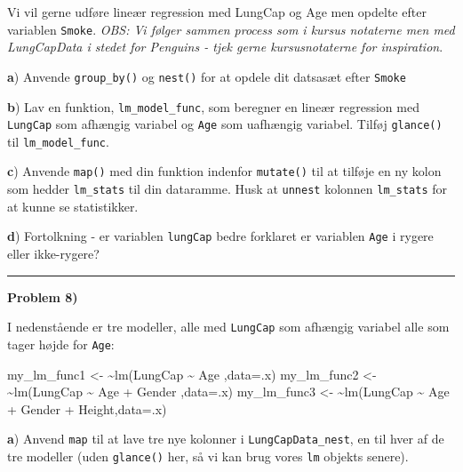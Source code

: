 \documentclass[
]{book}
\newenvironment{Shaded}{\begin{snugshade}}{\end{snugshade}}
\newcommand{\AttributeTok}[1]{\textcolor[rgb]{0.77,0.63,0.00}{#1}}
\newcommand{\ErrorTok}[1]{\textcolor[rgb]{0.64,0.00,0.00}{\textbf{#1}}}
\newcommand{\FunctionTok}[1]{\textcolor[rgb]{0.00,0.00,0.00}{#1}}
\newcommand{\NormalTok}[1]{#1}
\newcommand{\OtherTok}[1]{\textcolor[rgb]{0.56,0.35,0.01}{#1}}
\newcommand{\SpecialCharTok}[1]{\textcolor[rgb]{0.00,0.00,0.00}{#1}}
\begin{document}
Vi vil gerne udføre lineær regression med LungCap og Age men opdelte efter variablen \texttt{Smoke}. \emph{OBS: Vi følger sammen process som i kursus notaterne men med LungCapData i stedet for Penguins - tjek gerne kursusnotaterne for inspiration}.

\textbf{a}) Anvende \texttt{group\_by()} og \texttt{nest()} for at opdele dit datsasæt efter \texttt{Smoke}

\textbf{b}) Lav en funktion, \texttt{lm\_model\_func}, som beregner en lineær regression med \texttt{LungCap} som afhængig variabel og \texttt{Age} som uafhængig variabel. Tilføj \texttt{glance()} til \texttt{lm\_model\_func}.

\textbf{c}) Anvende \texttt{map()} med din funktion indenfor \texttt{mutate()} til at tilføje en ny kolon som hedder \texttt{lm\_stats} til din dataramme. Husk at \texttt{unnest} kolonnen \texttt{lm\_stats} for at kunne se statistikker.

\textbf{d}) Fortolkning - er variablen \texttt{lungCap} bedre forklaret er variablen \texttt{Age} i rygere eller ikke-rygere?

\begin{center}\rule{0.5\linewidth}{0.5pt}\end{center}

\textbf{Problem 8)}

I nedenstående er tre modeller, alle med \texttt{LungCap} som afhængig variabel alle som tager højde for \texttt{Age}:

\begin{Shaded}
\begin{Highlighting}[]
\NormalTok{my\_lm\_func1 }\OtherTok{\textless{}{-}}  \ErrorTok{\textasciitilde{}}\FunctionTok{lm}\NormalTok{(LungCap }\SpecialCharTok{\textasciitilde{}}\NormalTok{ Age                  ,}\AttributeTok{data=}\NormalTok{.x)}
\NormalTok{my\_lm\_func2 }\OtherTok{\textless{}{-}}  \ErrorTok{\textasciitilde{}}\FunctionTok{lm}\NormalTok{(LungCap }\SpecialCharTok{\textasciitilde{}}\NormalTok{ Age }\SpecialCharTok{+}\NormalTok{ Gender         ,}\AttributeTok{data=}\NormalTok{.x)}
\NormalTok{my\_lm\_func3 }\OtherTok{\textless{}{-}}  \ErrorTok{\textasciitilde{}}\FunctionTok{lm}\NormalTok{(LungCap }\SpecialCharTok{\textasciitilde{}}\NormalTok{ Age }\SpecialCharTok{+}\NormalTok{ Gender }\SpecialCharTok{+}\NormalTok{ Height,}\AttributeTok{data=}\NormalTok{.x)}
\end{Highlighting}
\end{Shaded}

\textbf{a}) Anvend \texttt{map} til at lave tre nye kolonner i \texttt{LungCapData\_nest}, en til hver af de tre modeller (uden \texttt{glance()} her, så vi kan brug vores \texttt{lm} objekts senere).
\end{document}
